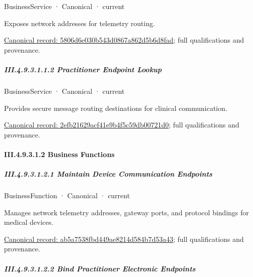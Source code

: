 \label{element:5806d6e030b543d0867a862d5b6d8fad}
{\small BusinessService · Canonical · current}\par

Exposes network addresses for telemetry routing.


{\footnotesize \href{../../../../../../../../continuum/business/business-service/5806d6e030b543d0867a862d5b6d8fad.md}{Canonical record: 5806d6e030b543d0867a862d5b6d8fad}; full qualifications and provenance.}\par
\subparagraph*{III.4.9.3.1.1.2 Practitioner Endpoint Lookup}
\label{navigation:III.4.9.3.1.1.2}

\label{element:2efb21629acf41e9b4f5c59db00721d0}
{\small BusinessService · Canonical · current}\par

Provides secure message routing destinations for clinical communication.


{\footnotesize \href{../../../../../../../../continuum/business/business-service/2efb21629acf41e9b4f5c59db00721d0.md}{Canonical record: 2efb21629acf41e9b4f5c59db00721d0}; full qualifications and provenance.}\par
\paragraph*{III.4.9.3.1.2 Business Functions}
\label{navigation:III.4.9.3.1.2}

\subparagraph*{III.4.9.3.1.2.1 Maintain Device Communication Endpoints}
\label{navigation:III.4.9.3.1.2.1}

\label{element:ab5a7538fbd449ae8214d584b7d53a43}
{\small BusinessFunction · Canonical · current}\par

Manages network telemetry addresses, gateway ports, and protocol bindings for medical devices.


{\footnotesize \href{../../../../../../../../continuum/business/business-function/ab5a7538fbd449ae8214d584b7d53a43.md}{Canonical record: ab5a7538fbd449ae8214d584b7d53a43}; full qualifications and provenance.}\par
\subparagraph*{III.4.9.3.1.2.2 Bind Practitioner Electronic Endpoints}
\label{navigation:III.4.9.3.1.2.2}

